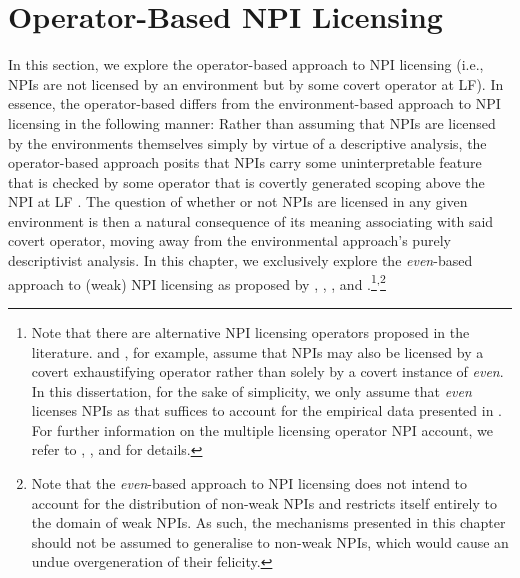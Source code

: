 \section{Operator-Based NPI Licensing}
In this section, we explore the operator-based approach to NPI licensing (i.e., NPIs are not licensed by an environment but by some covert operator at LF). In essence, the operator-based differs from the environment-based approach to NPI licensing in the following manner: Rather than assuming that NPIs are licensed by the environments themselves simply by virtue of a descriptive analysis, the operator-based approach posits that NPIs carry some uninterpretable feature that is checked by some operator that is covertly generated scoping above the NPI at LF \parencite[see][]{Chierchia2013}. The question of whether or not NPIs are licensed in any given environment is then a natural consequence of its meaning associating with said covert operator, moving away from the environmental approach's purely descriptivist analysis. 
In this chapter, we exclusively explore the \textit{even}-based approach to (weak) NPI licensing as proposed by \textcite{Lee1994}, \textcite{Lahiri1998}, \textcite{Crnic2011,Crnic2014-dogma,Crnic2014-nm}, and \textcite{Jeong2021,Jeong2022}.\footnote{Note that there are alternative NPI licensing operators proposed in the literature. \textcite{Krifka1995} and \textcite{Chierchia2013}, for example, assume that NPIs may also be licensed by a covert exhaustifying operator rather than solely by a covert instance of \textit{even}. In this dissertation, for the sake of simplicity, we only assume that \textit{even} licenses NPIs as that suffices to account for the empirical data presented in  \parencite{Crnic2011,Crnic2014-dogma,Crnic2014-nm}. For further information on the multiple licensing operator NPI account, we refer to \textcite{Krifka1995}, \textcite{Chierchia2013}, and \textcite[p.~41ff]{Crnic2014-nm} for details.}\textsuperscript{,}\footnote{Note that the \textit{even}-based approach to NPI licensing does not intend to account for the distribution of non-weak NPIs and restricts itself entirely to the domain of weak NPIs. As such, the mechanisms presented in this chapter should not be assumed to generalise to non-weak NPIs, which would cause an undue overgeneration of their felicity.}

